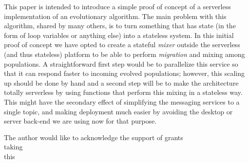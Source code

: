 \documentclass[sigconf]{acmart}
\begin{document}
This paper is intended to introduce a simple proof of concept of a
serverless implementation of an evolutionary algorithm. The main
problem with this algorithm, shared by many others, is to turn
something that has state (in the form of loop variables or anything
else) into a stateless system. In this initial proof of concept we have
opted to create a stateful {\em mixer} outside the serverless (and
thus stateless) platform to be able to perform {\em
  migration} and mixing among populations. A straightforward first step
would be to parallelize this service so that it can respond faster to
incoming evolved populations; however, this scaling up should be done
by hand and a second step will be to make the architecture totally
serverless by using functions that perform this mixing in a stateless
way. This might have the secondary effect of simplifying the messaging
services to a single topic, and making deployment much easier by
avoiding the desktop or server back-end we are using now for that
purpose.


\begin{acks}

  The author would like to acknowledge the support of grants\\
  taking\\
  this\\
\end{acks}




\end{document}
